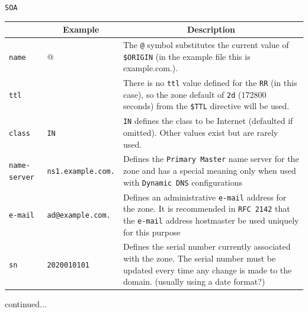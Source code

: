 \documentclass[aspectratio=169,xcolor=table]{beamer}
\begin{document}
\begin{frame}{\texttt{SOA}}
  \begin{table}
    \tiny
    \begin{tabular}{|p{1.6cm}|p{1.6cm}|p{5.7cm}|} 
      \hline
      \rowcolor{gray}
      \multicolumn{1}{|c|}{Syntax} & \multicolumn{1}{c|}{Example} & \multicolumn{1}{c|}{Description}\\ 
      \hline
      \texttt{name}&@&The \texttt{@} symbol substitutes the current value of \texttt{\$ORIGIN} (in the example file this is example.com.).\\
      \hline
      \texttt{ttl}&&There is no \texttt{ttl} value defined for the \texttt{RR} (in this case), so the zone default of \texttt{2d} (172800 seconds) from the \texttt{\$TTL} directive will be used.\\
      \hline
      \texttt{class}&\texttt{IN}&\texttt{IN} defines the class to be Internet (defaulted if omitted). Other values exist but are rarely used.\\
      \hline
      \texttt{name-server}&\texttt{ns1.example.com.}&Defines the \texttt{Primary Master} name server for the zone and has a special meaning only when used with \texttt{Dynamic DNS} configurations\\
      \hline
      \texttt{e-mail}&\texttt{ad@example.com.}&Defines an administrative \texttt{e-mail} address for the zone. It is recommended in \texttt{RFC 2142} that the \texttt{e-mail} address hostmaster be used uniquely for this purpose\\
      \hline
      \texttt{sn}&\texttt{2020010101}&Defines the serial number currently associated with the zone. The serial number must be updated every time any change is made to the domain. (usually using a date format?)\\
      \hline
    \end{tabular}
  \end{table}
  continued...
\end{frame}
\end{document}
